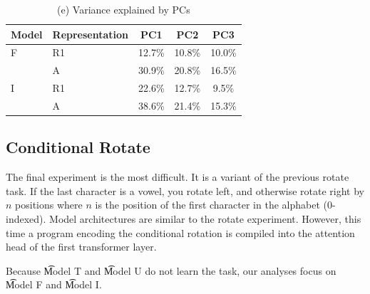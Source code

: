 \begin{table}[h]
\vspace{1.5em}
\centering
\begin{tabular}{llccc}
\toprule
\textbf{Model} & \textbf{Representation} & \textbf{PC1} & \textbf{PC2} & \textbf{PC3} \\
\midrule
F & R1 & 12.7\% & 10.8\% & 10.0\% \\
  & A & 30.9\% & 20.8\% & 16.5\% \\
\midrule
I & R1 & 22.6\% & 12.7\% & 9.5\% \\
  & A & 38.6\% & 21.4\% & 15.3\% \\
\bottomrule
\end{tabular}
\vspace{1em}
\caption*{(e) Variance explained by PCs}
\end{table}




\clearpage
\subsection{Conditional Rotate}
\label{app:experiments-cond-rotate}

The final experiment is the most difficult. It is a variant of the previous rotate task. If the last character is a vowel,
you rotate left, and otherwise rotate right by $n$ positions
where $n$ is the position of the first character in the alphabet (0-indexed). Model architectures are similar to the rotate
experiment. However, this time a program encoding the conditional rotation is compiled into the attention head of the first
transformer layer.

Because \t{Model T} and \t{Model U} do not learn the task, our analyses focus on \t{Model F} and \t{Model I}.

